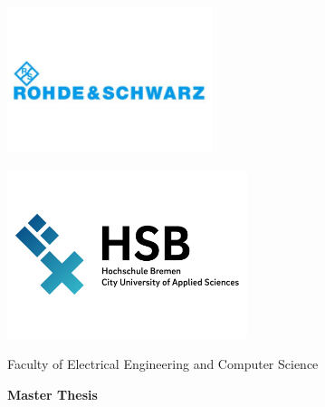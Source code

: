 \begin{titlepage}
\vspace*{-4cm}
\begin{flushleft}
	\begin{center}
		\includegraphics[width=6cm]{rns_logo.pdf}
	\end{center}
\end{flushleft}
\vspace*{-2.5cm}
\begin{flushleft}
	\begin{center}
		\includegraphics[width=7cm]{university_logo.pdf}
	\end{center}
\end{flushleft}
\vspace*{-1cm}
\noindent \begin{center}
Faculty of Electrical Engineering and Computer Science\\
\par\end{center}
\vspace*{0.1cm}
\noindent \begin{center}
\textbf{\large Master Thesis}
\par\end{center}{\large \par}



\end{titlepage}
